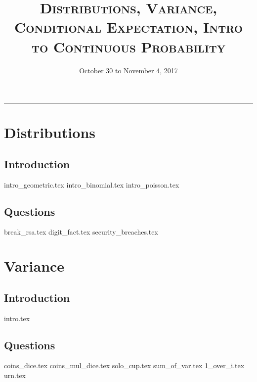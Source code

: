 \documentclass{exam}
\title{\textsc{Distributions, Variance, Conditional Expectation, Intro to Continuous Probability}}
\date{October 30 to November 4, 2017}
\begin{document}
\maketitle
\rule{\textwidth}{0.15em}
\fontsize{12}{15}\selectfont
\thispagestyle{empty}

\section{Distributions}
\subsection{Introduction}
{intro_geometric.tex}
{intro_binomial.tex}
{intro_poisson.tex}
\subsection{Questions}
\begin{questions}
	{break_rsa.tex}
	\clearpage
	{digit_fact.tex}
	{security_breaches.tex}
\end{questions}

\section{Variance}
\subsection{Introduction}
{intro.tex}
\subsection{Questions}
\begin{questions}
	{coins_dice.tex}
	{coins_mul_dice.tex}
	{solo_cup.tex}
	\clearpage
	{sum_of_var.tex}
	{1_over_i.tex}
	{urn.tex}
\end{questions}
\end{document}
